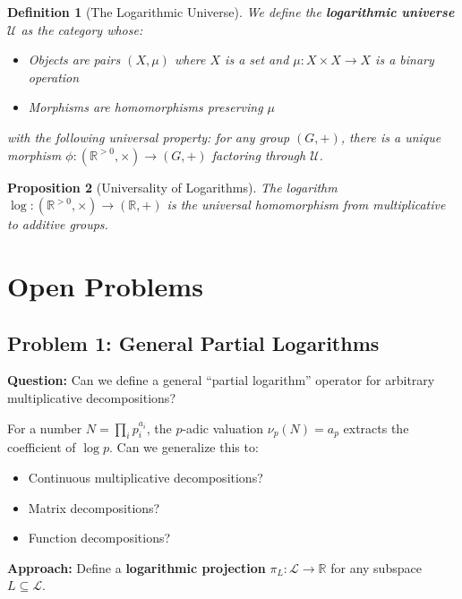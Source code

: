 \documentclass[11pt]{article}
\newtheorem{definition}{Definition}[section]
\newtheorem{proposition}[definition]{Proposition}
\begin{document}
\begin{definition}[The Logarithmic Universe]
We define the \textbf{logarithmic universe} $\mathcal{U}$ as the category whose:
\begin{itemize}
\item Objects are pairs $(X, \mu)$ where $X$ is a set and $\mu: X \times X \to X$ is a binary operation
\item Morphisms are homomorphisms preserving $\mu$
\end{itemize}
with the following universal property: for any group $(G, +)$, there is a unique morphism $\phi: (\mathbb{R}^{>0}, \times) \to (G, +)$ factoring through $\mathcal{U}$.
\end{definition}

\begin{proposition}[Universality of Logarithms]
The logarithm $\log: (\mathbb{R}^{>0}, \times) \to (\mathbb{R}, +)$ is the universal homomorphism from multiplicative to additive groups.
\end{proposition}

\section{Open Problems}
\label{sec:open}

\subsection{Problem 1: General Partial Logarithms}
\label{prob:partial}

\textbf{Question:} Can we define a general ``partial logarithm'' operator for arbitrary multiplicative decompositions?

For a number $N = \prod_i p_i^{a_i}$, the $p$-adic valuation $\nu_p(N) = a_p$ extracts the coefficient of $\log p$. Can we generalize this to:
\begin{itemize}
\item Continuous multiplicative decompositions?
\item Matrix decompositions?
\item Function decompositions?
\end{itemize}

\textbf{Approach:} Define a \textbf{logarithmic projection} $\pi_L: \mathcal{L} \to \mathbb{R}$ for any subspace $L \subseteq \mathcal{L}$.
\end{document}
